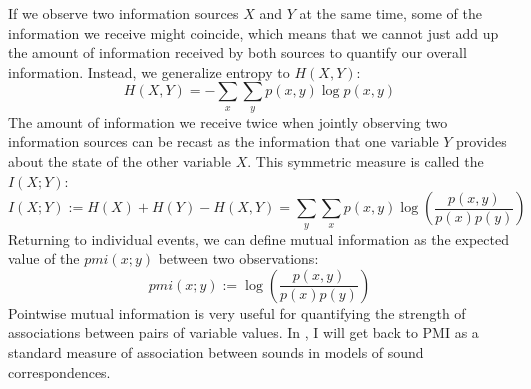 If we observe two information sources $X$ and $Y$ at the same time, some of the information we receive might coincide, which means that we cannot just add up the amount of information received by both sources to quantify our overall information. Instead, we generalize entropy to \textit{} $H(X,Y)$:
 \begin{equation}
  H(X,Y) = -\sum_{x} \sum_{y} p(x,y) \log p(x,y)
 \end{equation}
The amount of information we receive twice when jointly observing two information sources can be recast as the information
that one variable $Y$ provides about the state of the other variable $X$. This symmetric measure
is called the \textit{} $I(X;Y)$:
 \begin{equation}
  I(X;Y) := H(X) + H(Y) - H(X,Y) = \sum_{y} \sum_{x} p(x,y) \log \left( \frac{p(x,y)}{p(x)p(y)} \right) 
 \end{equation}
Returning to individual events, we can define mutual information as the expected value of the \textit{} $pmi(x;y)$
between two observations:
 \begin{equation}
  pmi(x;y) := \log \left( \frac{p(x,y)}{p(x)p(y)} \right) 
 \end{equation}
Pointwise mutual information is very useful for quantifying the strength of associations between
pairs of variable values. In , I will get back to PMI as a standard measure 
of association between sounds in models of sound correspondences.

